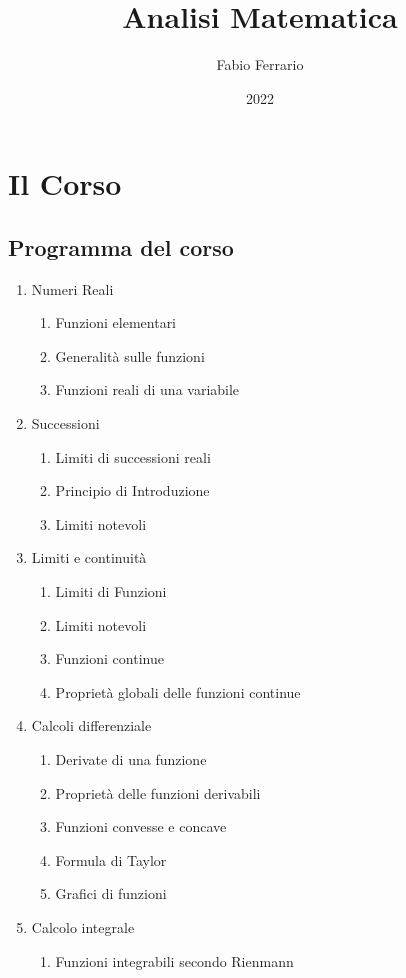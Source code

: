 \documentclass[12pt, a4paper, openany]{book}
\begin{document}
\title{Analisi Matematica}
\author{Fabio Ferrario}
\date{2022}
\maketitle
\chapter{Il Corso}
\section{Programma del corso}
\begin{enumerate}
\item Numeri Reali
\begin{enumerate}
\item Funzioni elementari
\item Generalità sulle funzioni
\item Funzioni reali di una variabile
\end{enumerate}
\item Successioni
\begin{enumerate}
    \item Limiti di successioni reali
    \item Principio di Introduzione
    \item Limiti notevoli
\end{enumerate}
\item Limiti e continuità
\begin{enumerate}
    \item Limiti di Funzioni
    \item Limiti notevoli
    \item Funzioni continue
    \item Proprietà globali delle funzioni continue
\end{enumerate}
\item Calcoli differenziale
\begin{enumerate}
    \item Derivate di una funzione
    \item Proprietà delle funzioni derivabili
    \item Funzioni convesse e concave
    \item Formula di Taylor
    \item Grafici di funzioni
\end{enumerate}
\item Calcolo integrale
\begin{enumerate}
    \item Funzioni integrabili secondo Rienmann

\end{enumerate}
\end{enumerate}
\end{document}
